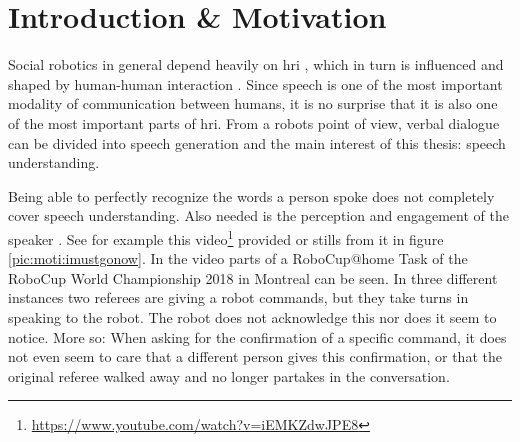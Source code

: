 
\chapter{Introduction \& Motivation}
\label{motiv:start}
Social robotics in general depend heavily on \gls{hri} \cite{6926324}, which in turn is influenced and shaped by human-human interaction \cite{mediaequation}.
Since speech is one of the most important modality of communication between humans, it is no surprise that it is also one of the most important parts of \gls{hri}.
From a robots point of view, verbal dialogue can be divided into speech generation and the main interest of this thesis: speech understanding.

Being able to perfectly recognize the words a person spoke does not completely cover speech understanding.
Also needed is the perception and engagement of the speaker \cite{Ivaldi2017}.
See for example this video\footnote{\url{https://www.youtube.com/watch?v=iEMKZdwJPE8}} provided or stills from it in figure \ref{pic:moti:imustgonow}.
In the video parts of a RoboCup@home Task of the RoboCup World Championship 2018 in Montreal can be seen.
In three different instances two referees are giving a robot commands, but they take turns in speaking to the robot.
The robot does not acknowledge this nor does it seem to notice.
More so: When asking for the confirmation of a specific command, it does not even seem to care that a different person gives this confirmation, or that the original referee walked away and no longer partakes in the conversation.

